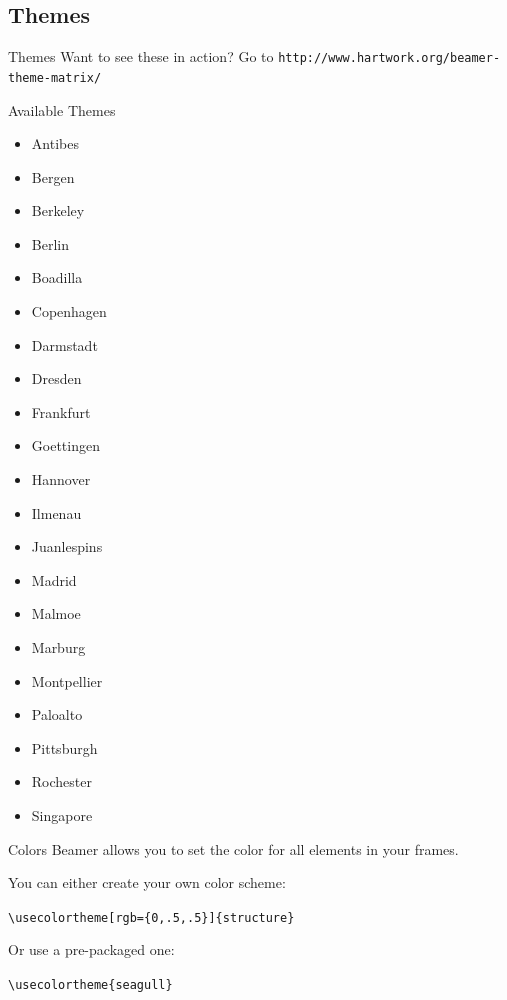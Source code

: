 \documentclass[mathserif, xcolor=svgnames]{beamer}
\begin{document}
\subsection{Themes}
\begin{frame}[fragile]{Themes}
Want to see these in action? Go to \verb+http://www.hartwork.org/beamer-theme-matrix/+

\begin{block}{Available Themes}
\begin{multicols}{3}
\begin{itemize}
\item Antibes
\item Bergen 
\item Berkeley 
\item Berlin
\item Boadilla 
\item Copenhagen 
\item Darmstadt 
\item Dresden
\item Frankfurt 
\item Goettingen 
\item Hannover 
\item Ilmenau
\item Juanlespins 
\item Madrid 
\item Malmoe 
\item Marburg
\item Montpellier 
\item Paloalto 
\item Pittsburgh 
\item Rochester
\item Singapore
\end{itemize}
\end{multicols}
\end{block}
\end{frame}



\begin{frame}[fragile, label=sixth]{Colors}
Beamer allows you to set the color for all elements in your frames.
\vspace{15pt}

You can either create your own color scheme:

\verb+\usecolortheme[rgb={0,.5,.5}]{structure} +

\vspace{10pt}

Or use a pre-packaged one:

\verb+\usecolortheme{seagull}+

\end{frame}
\end{document}

